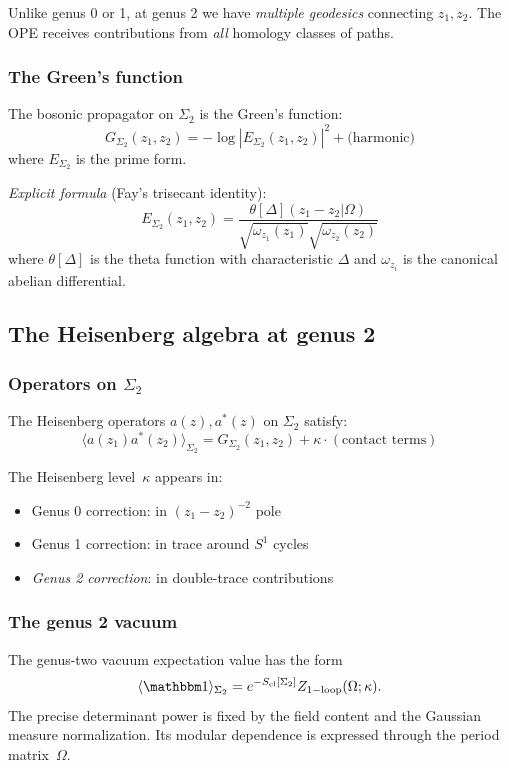 Unlike genus 0 or 1, at genus 2 we have \emph{multiple geodesics} connecting $z_1, z_2$.
The OPE receives contributions from \emph{all} homology classes of paths.

\subsubsection{The Green's function}

The bosonic propagator on $\Sigma_2$ is the Green's function:
\[G_{\Sigma_2}(z_1, z_2) = -\log|E_{\Sigma_2}(z_1, z_2)|^2 + \text{(harmonic)}\]
where $E_{\Sigma_2}$ is the prime form.

\emph{Explicit formula} (Fay's trisecant identity):
\[E_{\Sigma_2}(z_1, z_2) = \frac{\theta[\Delta](z_1 - z_2 | \Omega)}
{\sqrt{\omega_{z_1}(z_1)} \sqrt{\omega_{z_2}(z_2)}}\]
where $\theta[\Delta]$ is the theta function with characteristic $\Delta$ and $\omega_{z_i}$ is the canonical abelian differential.

\subsection{The Heisenberg algebra at genus 2}

\subsubsection{\texorpdfstring{Operators on $\Sigma_2$}{Operators on -2}}

The Heisenberg operators $a(z), a^*(z)$ on $\Sigma_2$ satisfy:
\[\langle a(z_1) a^*(z_2) \rangle_{\Sigma_2} = G_{\Sigma_2}(z_1, z_2) + \kappa \cdot (\text{contact terms})\]

The Heisenberg level~$\kappa$ appears in:
\begin{itemize}
\item Genus 0 correction: in $(z_1 - z_2)^{-2}$ pole
\item Genus 1 correction: in trace around $S^1$ cycles
\item \emph{Genus 2 correction}: in double-trace contributions
\end{itemize}

\subsubsection{The genus 2 vacuum}

The genus-two vacuum expectation value has the form
\[
 \langle\mathbbm 1\rangle_{\Sigma_2}
 =e^{-S_{\mathrm{cl}}[\Sigma_2]}
 Z_{\mathrm{1-loop}}(\Omega;\kappa).
\]
The precise determinant power is fixed by the field content and the
Gaussian measure normalization.  Its modular dependence is expressed
through the period matrix~$\Omega$.

